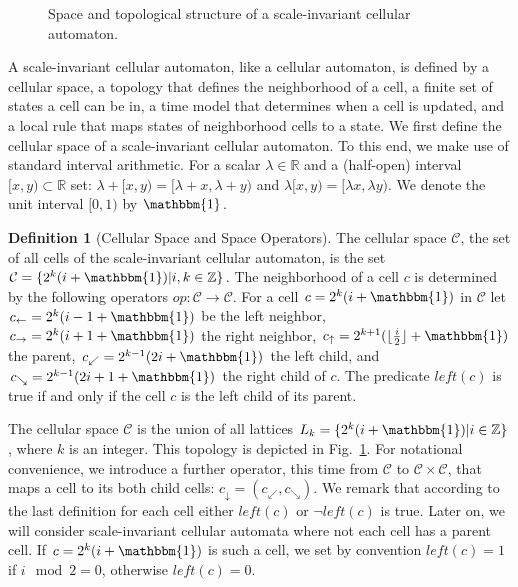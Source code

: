 \documentclass[pre,showpacs,showkeys,preprint]{revtex4}
\theoremstyle{definition}
\newtheorem{defn}{Definition}
\begin{document}
\begin{figure}
\begin{center}
\caption{\label{fig:1-dim-interaction} Space and topological structure of a scale-invariant cellular automaton.}
\end{center}
\end{figure}

A scale-invariant cellular automaton, like a cellular automaton, is defined by a cellular space, a topology that defines the neighborhood of a cell, a finite set of
states a cell can be in,  a time model that determines when a cell is updated, and a local rule that
maps states of neighborhood cells to a state.
We first define the cellular space of a scale-invariant cellular automaton.
To this end, we make use of standard interval arithmetic.
For a scalar $\lambda \in \mathbb{R}$ and a (half-open) interval $[x,y) \subset \mathbb{R}$ set:
$\lambda + [x,y) = [\lambda + x, \lambda + y)$ and $\lambda [x,y) = [\lambda x, \lambda y)$.
We denote the unit interval $[0,1)$ by $\mathbbm{1}$.

\begin{defn}[Cellular Space and Space Operators]
The cellular space $\mathcal{C}$, the set of all cells of the scale-invariant cellular automaton,
is the set $\mathcal{C} = \{ 2^k (i + \mathbbm{1}) | i, k \in \mathbb Z\}$.
The neighborhood of a cell $c$ is determined by the following operators $\mathit{op}: \mathcal{C} \rightarrow \mathcal{C}$.
For a cell $c = 2^k (i + \mathbbm{1})$ in $\mathcal{C}$ let
$c_{\leftarrow} = 2^k (i - 1 + \mathbbm{1})$ be the left neighbor,
$c_{\rightarrow} = 2^k (i + 1 + \mathbbm{1})$ the right neighbor,
$c_{\uparrow} =  2^{k + 1} (\lfloor \frac{i}{2} \rfloor + \mathbbm{1})$ the parent,
$c_{\swarrow} = 2^{k-1}(2i + \mathbbm{1})$ the left child,
and $c_{\searrow} = 2^{k-1}(2i + 1 + \mathbbm{1})$ the right child of $c$.
The predicate $\mathit{left}(c)$ is true if and only if the cell $c$ is the left child of its parent.
\end{defn}
The cellular space $\mathcal{C}$ is the union of all lattices $L_k=\{2^k (i + \mathbbm{1})| i \in \mathbb Z\}$, where $k$ is an integer.
This topology is depicted in Fig.~\ref{fig:1-dim-interaction}.
For notational convenience, we introduce a further operator, this time from $\mathcal{C}$ to $\mathcal{C} \times \mathcal{C}$,
that maps a cell to its both child cells:
 $c_{\downarrow} = (c_{\swarrow}, c_{\searrow})$.
We remark that according to the last definition for each cell either $\mathit{left}(c)$ or $\neg \mathit{left}(c)$ is true.
Later on, we will consider scale-invariant cellular automata where not each cell has a parent cell.
If $c = 2^k (i + \mathbbm{1})$ is such a cell, we set by convention $\mathit{left}(c) = 1$ if $i \mod 2 = 0$, otherwise $\mathit{left}(c) = 0$.
\end{document}
